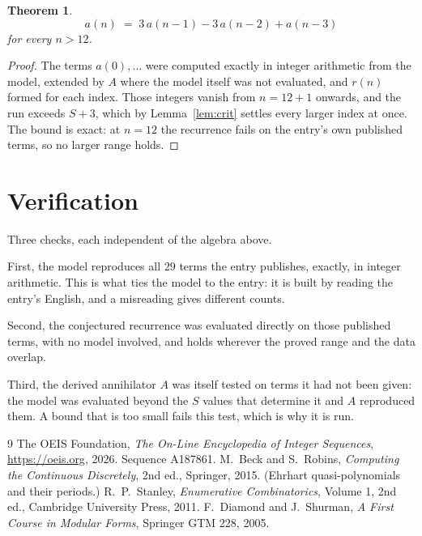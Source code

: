 \documentclass[11pt,a4paper]{article}
\theoremstyle{plain}
\newtheorem{theorem}{Theorem}
\theoremstyle{definition}
\begin{document}
\begin{theorem}
\[
a(n)\;=\;3\,a(n-1) - 3\,a(n-2) + a(n-3)
\]
for every $n>12$.
\end{theorem}

\begin{proof}
The terms $a(0),\dots$ were computed exactly in integer arithmetic from the model, extended by
$A$ where the model itself was not evaluated, and $r(n)$ formed for each index. Those integers
vanish from $n=12+1$ onwards, and the run exceeds $S+3$, which by
Lemma~\ref{lem:crit} settles every larger index at once. The bound is exact: at $n=12$ the recurrence fails on the entry's own published terms, so no larger range holds.
\end{proof}

\section{Verification}

Three checks, each independent of the algebra above.

First, the model reproduces all $29$ terms the entry publishes, exactly, in integer
arithmetic. This is what ties the model to the entry: it is built by reading the entry's
English, and a misreading gives different counts.

Second, the conjectured recurrence was evaluated directly on those published terms, with no
model involved, and holds wherever the proved range and the data overlap.

Third, the derived annihilator $A$ was itself tested on terms it had not been given: the model
was evaluated beyond the $S$ values that determine it and $A$ reproduced them. A bound that is
too small fails this test, which is why it is run.

\begin{thebibliography}{9}
 The OEIS Foundation, \emph{The On-Line Encyclopedia of Integer
Sequences}, \url{https://oeis.org}, 2026. Sequence A187861.
 M.~Beck and S.~Robins, \emph{Computing the Continuous Discretely},
2nd ed., Springer, 2015. (Ehrhart quasi-polynomials and their periods.)
 R.~P.~Stanley, \emph{Enumerative Combinatorics}, Volume 1, 2nd ed.,
Cambridge University Press, 2011.
 F.~Diamond and J.~Shurman, \emph{A First Course in Modular Forms},
Springer GTM 228, 2005.
\end{thebibliography}
\end{document}
